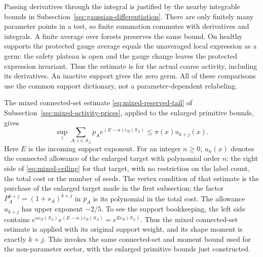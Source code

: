 Passing derivatives through the integral is justified by the
nearby integrable bounds in Subsection~\ref{sec:gaussian-differentiation}.
There are only finitely many parameter points in a test, so
finite summation commutes with derivatives and integrals. A finite
average over forests preserves the same bound. On healthy supports
the protected gauge average equals the unaveraged local expression
as a germ: the safety plateau is open and the gauge change leaves
the protected expression invariant. Thus the estimate is for the
actual coarse activity, including its derivatives. An inactive
support gives the zero germ. All of these comparisons use the common
support dictionary, not a parameter-dependent relabeling.

The mixed connected-set estimate \eqref{eq:mixed-reserved-tail}
of Subsection~\ref{sec:mixed-activity-prices}, applied to the enlarged
primitive bounds, gives
\begin{equation}\label{eq:sector-first-root}
       \sup_z\sum_{A:z\in S_A}p_Ae^{(E-\alpha)c_B(S_A)}
                                              \le\pi(x)u_{k+j}(x).
\end{equation}
Here $E$ is the incoming support exponent. For an integer $n\ge0$,
$u_n(x)$ denotes the connected allowance of the enlarged target with
polynomial order $n$: the right side of \eqref{eq:mixed-ceiling} for
that target, with no restriction on the label count, the total cost
or the number of seeds. The vertex condition of that estimate is the
purchase of the enlarged target made in the first subsection; the
factor $P_A^{k+j}=(1+s_A)^{k+j}$ in $p_A$ is its polynomial in the
total cost. The allowance $u_{k+j}$ has upper exponent $-2/5$. To see
the support bookkeeping,
the left side contains
$e^{\alpha c_B(S_A)}e^{(E-\alpha)c_B(S_A)}
=e^{Ec_B(S_A)}$. Thus the mixed connected-set estimate is applied
with its original support weight, and its shape moment is exactly
$k+j$. This invokes the same connected-set and moment bound used
for the non-parameter sector, with the enlarged primitive bounds
just constructed.

